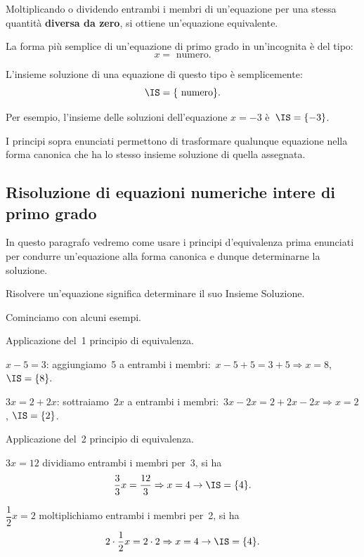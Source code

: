 \begin{principio}
 Moltiplicando o dividendo entrambi i membri di un'equazione 
per una stessa quantità \textbf{diversa da zero}, 
si ottiene un'equazione equivalente.
\end{principio}

La forma più semplice di un'equazione di primo grado in
un'incognita è del tipo:
\[x = \text{ numero}.\]

L'insieme soluzione di una
equazione di questo tipo è semplicemente:
\[\IS=\{\text{ numero} \}.\]

Per esempio, l'insieme delle soluzioni dell'equazione
\(x = -3\) è~\(\IS =\{-3\}\).

I principi sopra enunciati permettono di trasformare qualunque equazione
nella forma canonica che ha lo stesso insieme soluzione di quella
assegnata.

\subsection{Risoluzione di equazioni numeriche intere di primo grado}
In questo paragrafo vedremo come usare i principi
d'equivalenza prima enunciati per condurre
un'equazione alla forma canonica e dunque determinarne
la soluzione.

\begin{definizione}
Risolvere un'equazione significa
determinare il suo Insieme Soluzione.
\end{definizione}

Cominciamo con alcuni esempi.

 \begin{esempio}
Applicazione del~1{\textdegree} principio di equivalenza.

\begin{enumeratea}
\item \(x-5=3\):
aggiungiamo~5 a entrambi i membri:~\(x-5+5=3+5\Rightarrow x=8\), \(\IS =\{8\}.\)
\item \(3x=2+2x\): sottraiamo~\(2x\) a entrambi i 
membri:~\(3x-2x=2+2x-2x\Rightarrow 
x=2\),
\(\IS =\{2\}\).
\end{enumeratea}
 \end{esempio}


 \begin{esempio}
 Applicazione del~2{\textdegree} principio di equivalenza.

 \begin{enumeratea}
\item \(3x=12\) dividiamo entrambi i membri per~3, si ha
\[\dfrac{3}{3}x=\dfrac{12}{3}\Rightarrow x=4\to\IS =\{4\}.\]
\item \(\dfrac{1}{2}x=2\) moltiplichiamo entrambi i membri per~2, si ha
\[2\cdot {\dfrac{1}{2}}x=2\cdot 2\Rightarrow x=4\to\IS =\{4\}.\]
\end{enumeratea}
\end{esempio}

